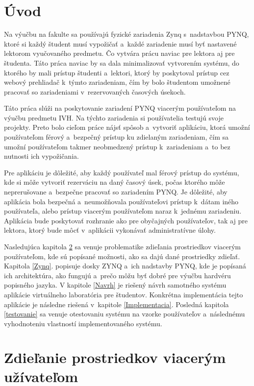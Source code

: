 \chapter{Úvod}

Na výučbu na fakulte sa používajú fyzické zariadenia Zynq s~nadstavbou PYNQ, ktoré si každý študent musí vypožičať a~každé zariadenie musí byť nastavené lektorom vyučovaného predmetu. Čo vytvára prácu naviac pre lektora aj pre študenta. Táto práca naviac by sa dala minimalizovať vytvorením systému, do ktorého by mali prístup študenti a~lektori, ktorý by poskytoval prístup cez webový prehliadač k~týmto zariadeniam, čím by bolo študentom umožnené pracovať so zariadeniami v~rezervovaných časových úsekoch.   

Táto práca slúži na poskytovanie zariadení PYNQ viacerým používateľom na výučbu predmetu IVH. Na týchto zariadenia si používatelia testujú svoje projekty. Preto bolo cieľom práce nájsť spôsob a~vytvoriť aplikáciu, ktorá umožní používateľom férový a~bezpečný prístup ku zdielaným zariadeniam, čím sa umožní používateľom takmer neobmedzený prístup k~zariadeniam a~to bez nutnosti ich vypožičania.

Pre aplikáciu je dôležité, aby každý používateľ mal férový prístup do systému, kde si môže vytvoriť rezerváciu na daný časový úsek, počas ktorého môže neprerušovane a~bezpečne pracovať so zariadením PYNQ. Je dôležité, aby aplikácia bola bezpečná a~neumožňovala používateľovi prístup k~dátam iného používateľa, alebo prístup viacerým používateľom naraz k~jednému zariadeniu. Aplikácia bude poskytovať rozhranie ako pre obyčajných používateľov, tak aj pre lektora, ktorý bude môcť v~aplikácii vykonávať administratívne úlohy.

Nasledujúca kapitola \ref{prostriedky} sa venuje problematike zdieľania prostriedkov viacerým používateľom, kde sú popísané možnosti, ako sa dajú dané prostriedky zdieľať. Kapitola \ref{Zynq}. popisuje dosky ZYNQ a~ich nadstavby PYNQ, kde je popísaná ich architektúra, ako fungujú a~prečo môžu byť dobré pre výučbu hardvéru popisného jazyka. V kapitole \ref{Navrh} je riešený návrh samotného systému aplikácie virtuálneho laboratória pre študentov. Konkrétna implementácia tejto aplikácie je následne riešená v~kapitole \ref{Implementacia}. Posledná kapitola \ref{testovanie} sa venuje otestovaniu systému na vzorke používateľov a~následnému vyhodnoteniu vlastností implementovaného systému.

\chapter{Zdieľanie prostriedkov viacerým užívateľom}
\label{prostriedky}


